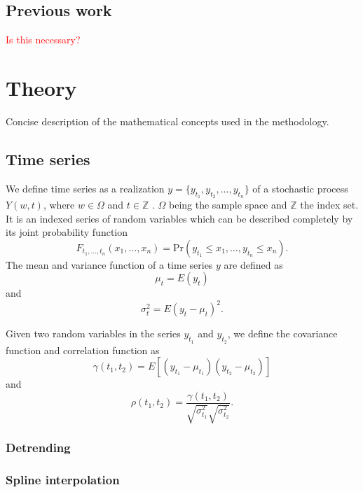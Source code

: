 \documentclass{article}
\theoremstyle{plain}
\theoremstyle{definition}
\theoremstyle{remark}
\begin{document}
\subsection{Previous work}
\textcolor{red}{Is this necessary?}


\section{Theory}
Concise description of the mathematical concepts used in the methodology.
\subsection{Time series}
We define time series as a realization $y = \{ y_{t_1}, y_{t_2}, \hdots, y_{t_n} \}$ of a stochastic process $Y(w, t)$, where $w \in \Omega$ and $t \in \mathbb{Z}$ \cite{wei}.
$\Omega$ being the sample space and $\mathbb{Z}$ the index set.
It is an indexed series of random variables which can be described completely by its joint probability function
\begin{equation*}
        F_{t_1,\hdots, t_n}(x_1, \hdots, x_n) = \text{Pr}( y_{t_1} \leq x_{1}, \hdots, y_{t_n} \leq x_n).
\end{equation*}
The mean and variance function of a time series $y$ are defined as
\begin{equation*}
        \mu_t = E(y_t)  
\end{equation*}
and
\begin{equation*}
        \sigma_t^2 = E(y_t - \mu_t)^2.
\end{equation*}

Given two random variables in the series $y_{t_1}$ and $y_{t_2}$, we define the covariance function and correlation function as
\begin{equation*}
        \gamma (t_{1}, t_2) = E[(y_{t_1} - \mu_{t_1})(y_{t_2} - \mu_{t_2})]
\end{equation*}
and 
\begin{equation*}
        \rho(t_1, t_2) = \frac{\gamma ( t_1, t_2)}{\sqrt{\sigma_{t_1}^2}\sqrt{\sigma_{t_2}^{2}}}.
\end{equation*}








\subsubsection{Detrending}
\subsubsection{Spline interpolation}
\end{document}
